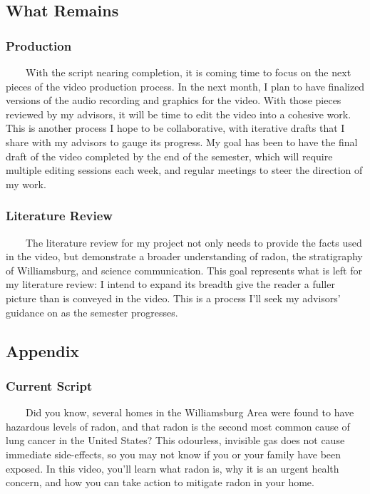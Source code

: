 \documentclass[
]{article}
\begin{document}
\subsection{What Remains}

\subsubsection{Production}

~~~~With the script nearing completion, it is coming time to focus on the
next pieces of the video production process. In the next month, I plan
to have finalized versions of the audio recording and graphics for the
video. With those pieces reviewed by my advisors, it will be time to
edit the video into a cohesive work. This is another process I hope to
be collaborative, with iterative drafts that I share with my advisors to
gauge its progress. My goal has been to have the final draft of the
video completed by the end of the semester, which will require multiple
editing sessions each week, and regular meetings to steer the direction
of my work.

\subsubsection{Literature Review}

~~~~The literature review for my project not only needs to provide the facts
used in the video, but demonstrate a broader understanding of radon, the
stratigraphy of Williamsburg, and science communication. This goal
represents what is left for my literature review: I intend to expand its
breadth give the reader a fuller picture than is conveyed in the video.
This is a process I'll seek my advisors' guidance on as the semester
progresses.

\subsection{Appendix}

\subsubsection{Current Script}

~~~~Did you know, several homes in the Williamsburg Area were found to have
hazardous levels of radon, and that radon is the second most common
cause of lung cancer in the United States? This odourless, invisible gas
does not cause immediate side-effects, so you may not know if you or
your family have been exposed. In this video, you'll learn what radon
is, why it is an urgent health concern, and how you can take action to
mitigate radon in your home.
\end{document}
